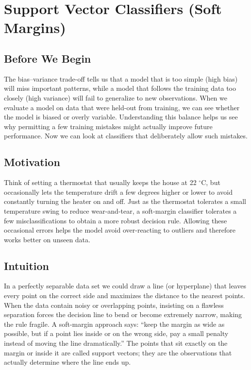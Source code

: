 \documentclass[12pt, a4paper]{article}
\begin{document}
\section{Support Vector Classifiers (Soft Margins)}

\subsection{Before We Begin}
The bias--variance trade-off tells us that a model that is too simple (high bias) will miss important patterns, while a model that follows the training data too closely (high variance) will fail to generalize to new observations.  
When we evaluate a model on data that were held-out from training, we can see whether the model is biased or overly variable.  
Understanding this balance helps us see why permitting a few training mistakes might actually improve future performance.  
Now we can look at classifiers that deliberately allow such mistakes.

\subsection{Motivation}
Think of setting a thermostat that usually keeps the house at 22 \ensuremath{^\circ}C, but occasionally lets the temperature drift a few degrees higher or lower to avoid constantly turning the heater on and off.  
Just as the thermostat tolerates a small temperature swing to reduce wear-and-tear, a soft-margin classifier tolerates a few misclassifications to obtain a more robust decision rule.  
Allowing these occasional errors helps the model avoid over-reacting to outliers and therefore works better on unseen data.

\subsection{Intuition}
In a perfectly separable data set we could draw a line (or hyperplane) that leaves every point on the correct side and maximizes the distance to the nearest points.  
When the data contain noisy or overlapping points, insisting on a flawless separation forces the decision line to bend or become extremely narrow, making the rule fragile.  
A soft-margin approach says: ``keep the margin as wide as possible, but if a point lies inside or on the wrong side, pay a small penalty instead of moving the line dramatically.''  
The points that sit exactly on the margin or inside it are called support vectors; they are the observations that actually determine where the line ends up.
\end{document}
